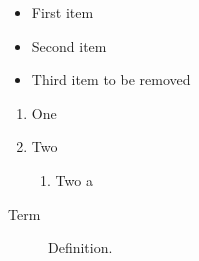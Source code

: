 \documentclass{article}
\begin{document}
\begin{itemize}
  \item First item
  \item Second item
  \item Third item to be removed
\end{itemize}
\begin{enumerate}
  \item One
  \item Two
  \begin{enumerate}
    \item Two a
  \end{enumerate}
\end{enumerate}
\begin{description}
  \item[Term] Definition.
\end{description}
\end{document}
